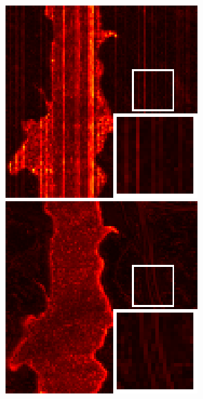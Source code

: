 \begin{figure}[t]
\begin{center}
		\begin{minipage}{0.15\hsize}
			\centerline{\includegraphics[width=\hsize]{./fig_supplement/SAM_map_color_woboundary/JasperRidge/sam_map_LRTDTV.eps}} %
		\end{minipage}
		\begin{minipage}{0.15\hsize}
			\centerline{\includegraphics[width=\hsize]{./fig_supplement/SAM_map_color_woboundary/JasperRidge/sam_map_FGSLR.eps}} %

\end{minipage}
\end{center}
\end{figure}

